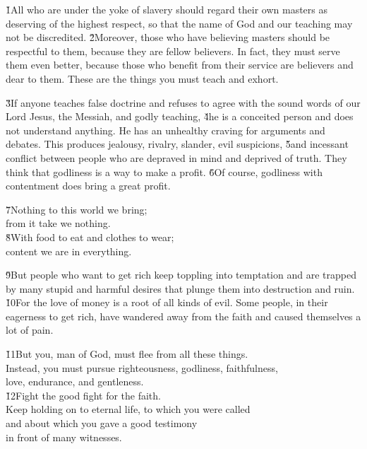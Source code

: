 \v{1}All who are under the yoke of slavery should regard their own masters as deserving of the highest respect, so that the name of God and our teaching may not be discredited. \v{2}Moreover, those who have believing masters should be respectful to them, because they are fellow believers. In fact, they must serve them even better, because those who benefit from their service are believers and dear to them. These are the things you must teach and exhort.

\v{3}If anyone teaches false doctrine and refuses to agree with the sound words of our Lord Jesus, the Messiah, and godly teaching, \v{4}he is a conceited person and does not understand anything. He has an unhealthy craving for arguments and debates. This produces jealousy, rivalry, slander, evil suspicions, \v{5}and incessant conflict between people who are depraved in mind and deprived of truth. They think that godliness is a way to make a profit. \v{6}Of course, godliness with contentment does bring a great profit.

\begin{poetry}
\poeml \v{7}Nothing to this world we bring; \\
\poemll    from it take we nothing. \\
\poeml \v{8}With food to eat and clothes to wear; \\
\poemll    content we are in everything.
\end{poetry}

\v{9}But people who want to get rich keep toppling into temptation and are trapped by many stupid and harmful desires that plunge them into destruction and ruin. \v{10}For the love of money is a root of all kinds of evil. Some people, in their eagerness to get rich, have wandered away from the faith and caused themselves a lot of pain.

\begin{poetry}
\poeml \v{11}But you, man of God, must flee from all these things. \\
\poemll    Instead, you must pursue righteousness, godliness, faithfulness, \\
\poemlll       love, endurance, and gentleness. \\
\poeml \v{12}Fight the good fight for the faith. \\
\poemll    Keep holding on to eternal life, to which you were called \\
\poeml and about which you gave a good testimony \\
\poemll    in front of many witnesses.
\end{poetry}

